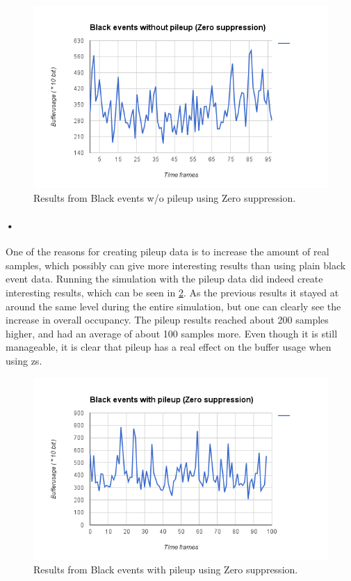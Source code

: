 \documentclass[a4paper, 12pt, openright, twoside]{report}
\begin{document}
\begin{figure}[h!]
	\centering
		\includegraphics[width=1.0\textwidth]{images/blackevents-zs.png}
		\caption{Results from Black events w/o pileup using Zero suppression.}
		\label{fig:blackevents-zs}
\end{figure}

\paragraph{•}
One of the reasons for creating pileup data is to increase the amount of real samples, which possibly can give more interesting results than using plain black event data.
Running the simulation with the pileup data did indeed create interesting results, which can be seen in \ref{fig:blackevents-pileup-zs}.
As the previous results it stayed at around the same level during the entire simulation, but one can clearly see the increase in overall occupancy.
The pileup results reached about 200 samples higher, and had an average of about 100 samples more.
Even though it is still manageable, it is clear that pileup has a real effect on the buffer usage when using \gls{zs}.

\begin{figure}[h!]
	\centering
		\includegraphics[width=1.0\textwidth]{images/blackevents-pileup-zs.png}
		\caption{Results from Black events with pileup using Zero suppression.}
		\label{fig:blackevents-pileup-zs}
\end{figure}
\end{document}
